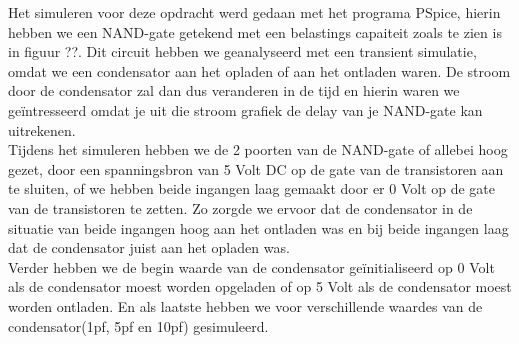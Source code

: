 \documentclass{article}
\begin{document}
Het simuleren voor deze opdracht werd gedaan met het programa PSpice, hierin hebben we een NAND-gate getekend met een belastings capaiteit zoals te zien is in figuur ??. Dit circuit hebben we geanalyseerd met een transient simulatie, omdat we een condensator aan het opladen of aan het ontladen waren. De stroom door de condensator zal dan dus veranderen in de tijd en hierin waren we geïntresseerd omdat je uit die stroom grafiek de delay van je NAND-gate kan uitrekenen.\\
Tijdens het simuleren hebben we de 2 poorten van de NAND-gate of allebei hoog gezet, door een spanningsbron van 5 Volt DC op de gate van de transistoren aan te sluiten, of we hebben beide ingangen laag gemaakt door er 0 Volt op de gate van de transistoren te zetten. Zo zorgde we ervoor dat de condensator in de situatie van beide ingangen hoog aan het ontladen was en bij beide ingangen laag dat de condensator juist aan het opladen was.\\
Verder hebben we de begin waarde van de condensator geïnitialiseerd op 0 Volt als de condensator moest worden opgeladen of op 5 Volt als de condensator moest worden ontladen. En als laatste hebben we voor verschillende waardes van de condensator(1pf, 5pf en 10pf) gesimuleerd.
\end{document}
